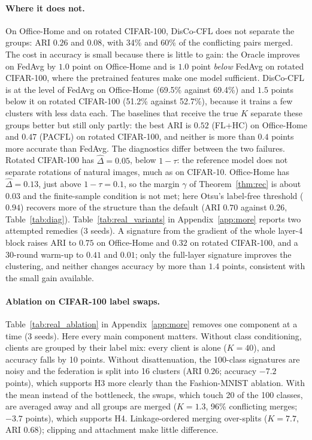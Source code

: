 \paragraph{Where it does not.} On Office-Home and on rotated CIFAR-100, DisCo-CFL does not separate the groups: ARI $0.26$ and $0.08$, with 34\% and 60\% of the conflicting pairs merged. The cost in accuracy is small because there is little to gain: the Oracle improves on FedAvg by $1.0$ point on Office-Home and is $1.0$ point \emph{below} FedAvg on rotated CIFAR-100, where the pretrained features make one model sufficient. DisCo-CFL is at the level of FedAvg on Office-Home (69.5\% against 69.4\%) and $1.5$ points below it on rotated CIFAR-100 (51.2\% against 52.7\%), because it trains a few clusters with less data each. The baselines that receive the true $K$ separate these groups better but still only partly: the best ARI is $0.52$ (FL+HC) on Office-Home and $0.47$ (PACFL) on rotated CIFAR-100, and neither is more than $0.4$ points more accurate than FedAvg. The diagnostics differ between the two failures. Rotated CIFAR-100 has $\hat\Delta=0.05$, below $1-\tau$: the reference model does not separate rotations of natural images, much as on CIFAR-10. Office-Home has $\hat\Delta=0.13$, just above $1-\tau=0.1$, so the margin $\gamma$ of Theorem~\ref{thm:rec} is about $0.03$ and the finite-sample condition is not met; here Otsu's label-free threshold ($0.94$) recovers more of the structure than the default (ARI $0.70$ against $0.26$, Table~\ref{tab:diag}). Table~\ref{tab:real_variants} in Appendix~\ref{app:more} reports two attempted remedies (3 seeds). A signature from the gradient of the whole layer-4 block raises ARI to $0.75$ on Office-Home and $0.32$ on rotated CIFAR-100, and a 30-round warm-up to $0.41$ and $0.01$; only the full-layer signature improves the clustering, and neither changes accuracy by more than $1.4$ points, consistent with the small gain available.



\paragraph{Ablation on CIFAR-100 label swaps.} Table~\ref{tab:real_ablation} in Appendix~\ref{app:more} removes one component at a time (3 seeds). Here every main component matters. Without class conditioning, clients are grouped by their label mix: every client is alone ($K=40$), and accuracy falls by 10 points. Without disattenuation, the 100-class signatures are noisy and the federation is split into 16 clusters (ARI $0.26$; accuracy $-7.2$ points), which supports H3 more clearly than the Fashion-MNIST ablation. With the mean instead of the bottleneck, the swaps, which touch 20 of the 100 classes, are averaged away and all groups are merged ($K=1.3$, 96\% conflicting merges; $-3.7$ points), which supports H4. Linkage-ordered merging over-splits ($K=7.7$, ARI $0.68$); clipping and attachment make little difference.



